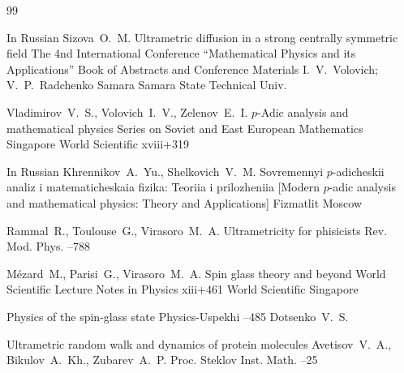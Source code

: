 \begin{thebibliography}{99}

\lang In Russian
\by Sizova~O.~M.
\paper Ultrametric diffusion in a strong centrally symmetric field
\inbook  The 4nd International Conference ``Mathematical Physics and its Applications''
\bookinfo Book of Abstracts and Conference Materials
\eds I.~V.~Volovich; V.~P.~Radchenko
\publaddr Samara
\publ Samara State Technical Univ.

\by Vladimirov~V.~S., Volovich~I.~V., Zelenov~E.~I.
\book $p$-Adic analysis and mathematical physics
\serial Series on Soviet and East European Mathematics
\publaddr Singapore
\publ World Scientific
\totalpages xviii+319 


\lang In Russian
\by Khrennikov~A.~Yu., Shelkovich~V.~M.
\book Sovremennyi $p$-adicheskii analiz i matematicheskaia fizika: Teoriia i prilozheniia 
\rm [Modern $ p $-adic analysis and mathematical physics: Theory and Applications]
\publ Fizmatlit
\publaddr Moscow

\by Rammal~R., Toulouse~G., Virasoro~M.~A.
\paper Ultrametricity for phisicists
\jour Rev. Mod. Phys.
--788

\by M\'ezard~M., Parisi~G., Virasoro~M.~A.
\book Spin glass theory and beyond
\serial World Scientific Lecture Notes in Physics
\totalpages xiii+461 
\publ World Scientific
\publaddr Singapore

\paper Physics of the spin-glass state
\jour Physics-Uspekhi 
--485
\by Dotsenko~V.~S.

\paper Ultrametric random walk and dynamics of protein molecules
\by Avetisov~V.~A., Bikulov~A.~Kh., Zubarev~A.~P.
\jour Proc. Steklov Inst. Math.
--25



\end{thebibliography}
